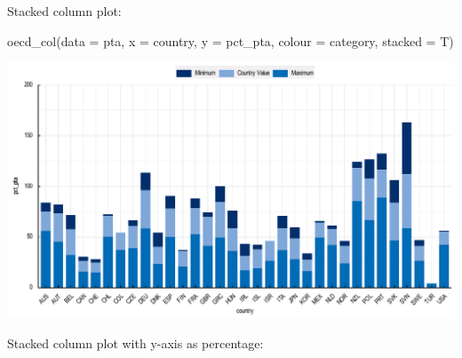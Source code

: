\documentclass[
  11pt,
  oneside]{report}
\newenvironment{Shaded}{\begin{snugshade}}{\end{snugshade}}
\newcommand{\AttributeTok}[1]{\textcolor[rgb]{0.77,0.63,0.00}{#1}}
\newcommand{\DecValTok}[1]{\textcolor[rgb]{0.00,0.00,0.81}{#1}}
\newcommand{\FunctionTok}[1]{\textcolor[rgb]{0.00,0.00,0.00}{#1}}
\newcommand{\NormalTok}[1]{#1}
\newcommand{\OtherTok}[1]{\textcolor[rgb]{0.56,0.35,0.01}{#1}}
\newcommand{\SpecialCharTok}[1]{\textcolor[rgb]{0.00,0.00,0.00}{#1}}
\begin{document}
Stacked column plot:

\begin{Shaded}
\begin{Highlighting}[]
\FunctionTok{oecd\_col}\NormalTok{(}\AttributeTok{data =}\NormalTok{ pta, }\AttributeTok{x =}\NormalTok{ country, }\AttributeTok{y =}\NormalTok{ pct\_pta, }\AttributeTok{colour =}\NormalTok{ category, }\AttributeTok{stacked =}\NormalTok{ T)}
\end{Highlighting}
\end{Shaded}

\begin{center}\includegraphics{book_figures/sc2-1} \end{center}

Stacked column plot with y-axis as percentage:

\begin{Shaded}
\end{Shaded}
\end{document}
